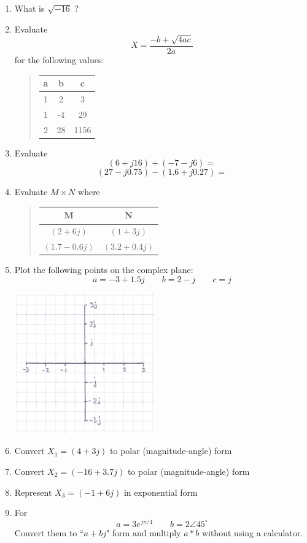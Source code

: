 \begin{enumerate}

\item  What is $\sqrt{-16}$ ?

\item  Evaluate
\[
X = \frac{-b + \sqrt{4ac}}{2a}
\]
for the following values:
\begin{quotation}
\begin{tabular} {c|c|c}
a&b&c  \\ \hline
1&2&3 \\
1&-4&29\\
2&28&1156
\end{tabular}
\end{quotation}


\item  Evaluate
\[
(6+j16) + (-7-j6) =
\]
\[
(27-j0.75) - (1.6+j0.27) =
\]


\item  Evaluate  $M\times N$ where

\begin{quotation}
\begin{tabular} {c|c}
M&N \\ \hline
$(2+6j)$	&	$(1+3j)$   	\\
$(1.7-0.6j)$    &	$(3.2+0.4j)$	\\
\end{tabular}
\end{quotation}


\item  Plot the following points on the complex plane:
\[
a = -3+1.5j \qquad b = 2-j \qquad c = j
\]


\includegraphics[width=6cm]{figsapdx/00926a.png}



\item  Convert $X_1=(4+3j)$ to polar (magnitude-angle) form


\item  Convert $X_2=(-16+3.7j)$ to polar (magnitude-angle) form


\item  Represent $X_3 = (-1+6j)$ in exponential form

\item  For
\[
a = 3e^{j\pi/4} \qquad b = 2\angle{45^\circ}
\]
Convert them to ``$a+bj$" form and multiply $a*b$ without using a calculator.

\end{enumerate}








